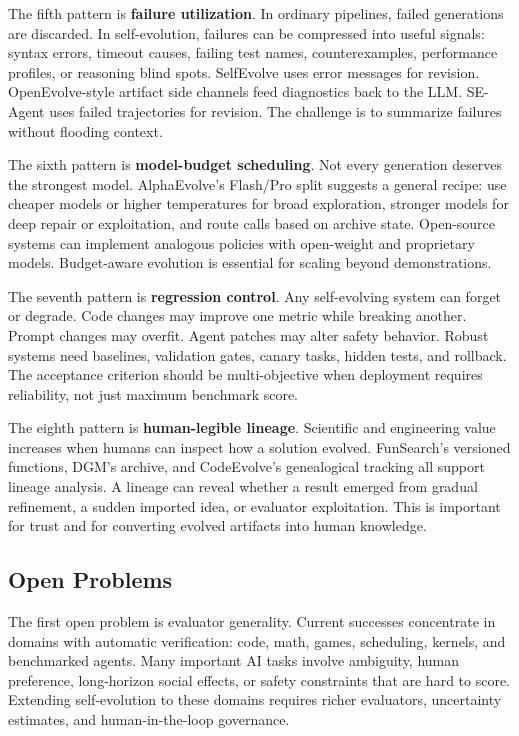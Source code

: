 The fifth pattern is \textbf{failure utilization}.  In ordinary pipelines, failed generations are discarded.  In self-evolution, failures can be compressed into useful signals: syntax errors, timeout causes, failing test names, counterexamples, performance profiles, or reasoning blind spots.  SelfEvolve uses error messages for revision.  OpenEvolve-style artifact side channels feed diagnostics back to the LLM.  SE-Agent uses failed trajectories for revision.  The challenge is to summarize failures without flooding context.

The sixth pattern is \textbf{model-budget scheduling}.  Not every generation deserves the strongest model.  AlphaEvolve's Flash/Pro split suggests a general recipe: use cheaper models or higher temperatures for broad exploration, stronger models for deep repair or exploitation, and route calls based on archive state.  Open-source systems can implement analogous policies with open-weight and proprietary models.  Budget-aware evolution is essential for scaling beyond demonstrations.

The seventh pattern is \textbf{regression control}.  Any self-evolving system can forget or degrade.  Code changes may improve one metric while breaking another.  Prompt changes may overfit.  Agent patches may alter safety behavior.  Robust systems need baselines, validation gates, canary tasks, hidden tests, and rollback.  The acceptance criterion should be multi-objective when deployment requires reliability, not just maximum benchmark score.

The eighth pattern is \textbf{human-legible lineage}.  Scientific and engineering value increases when humans can inspect how a solution evolved.  FunSearch's versioned functions, DGM's archive, and CodeEvolve's genealogical tracking all support lineage analysis.  A lineage can reveal whether a result emerged from gradual refinement, a sudden imported idea, or evaluator exploitation.  This is important for trust and for converting evolved artifacts into human knowledge.

\subsection{Open Problems}
\label{subsec:evolution-open-problems}

The first open problem is evaluator generality.  Current successes concentrate in domains with automatic verification: code, math, games, scheduling, kernels, and benchmarked agents.  Many important AI tasks involve ambiguity, human preference, long-horizon social effects, or safety constraints that are hard to score.  Extending self-evolution to these domains requires richer evaluators, uncertainty estimates, and human-in-the-loop governance.

